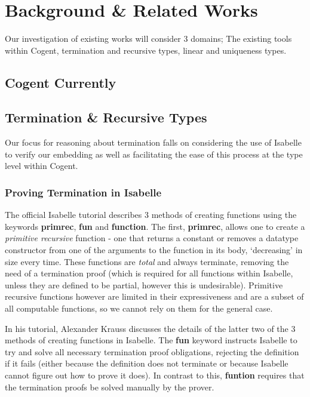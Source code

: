 \chapter{Background \& Related Works}\label{ch:background}

Our investigation of existing works will consider 3 domains; The existing tools within Cogent,
termination and recursive types, linear and uniqueness types.

\section{Cogent Currently}

\section{Termination \& Recursive Types}

Our focus for reasoning about termination falls on considering the use of Isabelle to verify our 
embedding as well as facilitating the ease of this process at the type level within Cogent. 

\subsection{Proving Termination in Isabelle}

The official Isabelle tutorial\cite{IsabelleTutorial} describes 3 methods of creating functions using the keywords 
\textbf{primrec}, \textbf{fun} and \textbf{function}. The first, \textbf{primrec}, allows one to create a 
\textit{primitive recursive} function - one that returns a constant or removes a datatype constructor from one
of the arguments to the function in its body, `decreasing' in size every time. These functions are \textit{total}
and always terminate, removing the need of a termination proof (which is required for all functions within Isabelle,
unless they are defined to be partial, however this is undesirable).
Primitive recursive functions however are limited in their expressiveness and are a subset of all computable
functions, so we cannot rely on them for the general case.

In his tutorial\cite{KraussIsabelle}, Alexander Krauss discusses the details of the latter two of the 3 methods
of creating functions in Isabelle. The \textbf{fun} keyword instructs Isabelle to try and solve all necessary
termination proof obligations, rejecting the definition if it fails (either because the definition does not 
terminate or because Isabelle cannot figure out how to prove it does). In contrast to this, \textbf{funtion}
requires that the termination proofs be solved manually by the prover.

